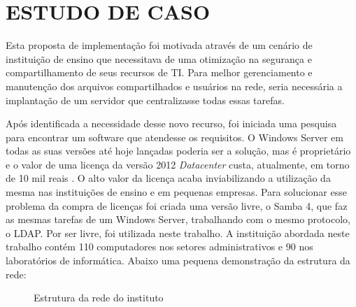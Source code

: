 \chapter{ESTUDO DE CASO}

Esta proposta de implementação foi motivada através de um cenário de instituição de ensino que necessitava de uma otimização na segurança e compartilhamento de seus recursos de TI. Para melhor gerenciamento e manutenção dos arquivos compartilhados e usuários na rede, seria necessária a implantação de um servidor que centralizasse todas essas tarefas.

Após identificada a necessidade desse novo recurso, foi iniciada uma pesquisa para encontrar um software que atendesse os requisitos. O Windows Server em todas as suas versões até hoje lançadas poderia ser a solução, mas é proprietário e o valor de uma licença da versão 2012 \textit{Datacenter} custa, atualmente, em torno de 10 mil reais \cite{SERVER}. O alto valor da licença acaba inviabilizando a utilização da mesma nas instituições  de ensino e em pequenas empresas. 
Para solucionar esse problema da compra de licenças foi criada uma versão livre, o Samba 4, que faz as mesmas tarefas de um Windows Server, trabalhando com o mesmo protocolo, o LDAP. Por ser livre, foi utilizada neste trabalho.
A instituição abordada neste trabalho contém 110 computadores nos setores administrativos e 90 nos laboratórios de informática. Abaixo uma pequena demonstração da estrutura da rede:

\begin{figure}[ht]
   	\centering
   	\caption{Estrutura da rede do instituto}
    \label{rede}
\end{figure}
          				
